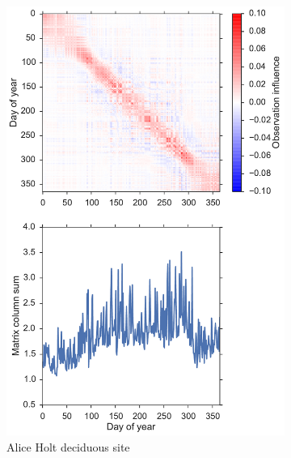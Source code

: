 \documentclass[11pt]{article}
\begin{document}
\begin{figure}[ht]
    \centering
    \begin{subfigure}[b]{0.46\textwidth}
        \includegraphics[width=\textwidth]{inf_mat_sa.pdf}
        \caption{Alice Holt deciduous site}
        \label{fig:ah_inf_mat}
    \end{subfigure}%
    \begin{subfigure}[b]{0.46\textwidth}

\end{subfigure}
\end{figure}
\end{document}
